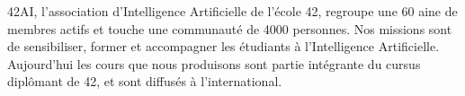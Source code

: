 42AI, l’association d’Intelligence Artificielle de l'école 42, regroupe une 60 aine de membres actifs et touche une communauté de 4000 personnes. Nos missions sont de sensibiliser, former et accompagner les étudiants à l'Intelligence Artificielle. Aujourd’hui les cours que nous produisons sont partie intégrante du cursus diplômant de 42, et sont diffusés à l’international.

\sectionspace
